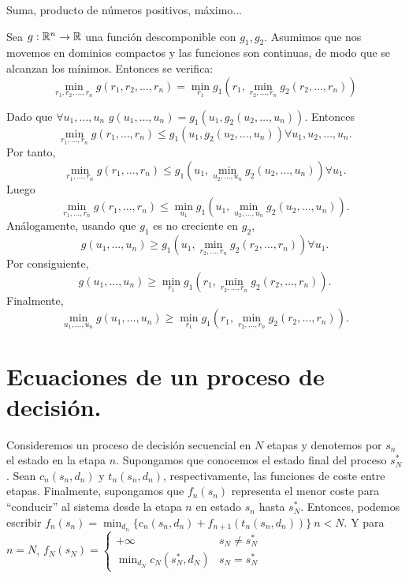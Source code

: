 \documentclass[MIOP.tex]{subfiles}
\begin{document}
\begin{ej}
Suma, producto de números positivos, máximo... 
\end{ej}

\begin{teorema}[Mitten] 
Sea $g:\mathbb{R}^n\to\mathbb{R}$ una función descomponible con $g_1,g_2$. Asumimos que nos movemos en dominios compactos y las funciones son continuas, de modo que se alcanzan los mínimos. Entonces se verifica:
$$\min_{r_1,r_2,\dots,r_n} g(r_1,r_2,\dots,r_n)=\min_{r_1} g_1(r_1,\min_{r_2,\dots,r_n}g_2(r_2,\dots,r_n))$$

\end{teorema}
\begin{dem}
Dado que $\forall u_1,\dots, u_n$ $g(u_1,\dots, u_n)=g_1(u_1,g_2(u_2,\dots, u_n))$. Entonces $$\min_{r_1,\dots,r_n}g(r_1,\dots,r_n)\leq g_1(u_1,g_2(u_2,\dots, u_n))\forall u_1,u_2,\dots,u_n.$$ Por tanto, $$\min_{r_1,\dots,r_n}g(r_1,\dots,r_n)\leq g_1(u_1,\min_{u_2,\dots,u_n}g_2(u_2,\dots, u_n))\forall u_1.$$ Luego $$\min_{r_1,\dots,r_n}g(r_1,\dots,r_n)\leq \min_{u_1}g_1(u_1,\min_{u_2,\dots,u_n}g_2(u_2,\dots, u_n)).$$
Análogamente, usando que $g_1$ es no creciente en $g_2$, $$g(u_1,\dots, u_n)\geq g_1(u_1,\min_{r_2,\dots,r_n}g_2(r_2,\dots,r_n))\forall u_1.$$ Por consiguiente, 
$$g(u_1,\dots, u_n)\geq \min_{r_1}g_1(r_1,\min_{r_2,\dots,r_n}g_2(r_2,\dots,r_n)).$$ Finalmente,
$$\min_{u_1,\dots,u_n}g(u_1,\dots, u_n)\geq \min_{r_1}g_1(r_1,\min_{r_2,\dots,r_n}g_2(r_2,\dots,r_n)).$$\QED
\end{dem}

\section{Ecuaciones de un proceso de decisión.}
Consideremos un proceso de decisión secuencial en $N$ etapas y denotemos por $s_n$ el estado en la etapa $n$. Supongamos que conocemos el estado final del proceso $s_N^*$. Sean $c_n(s_n,d_n)$ y $t_n(s_n,d_n)$, respectivamente, las funciones de coste entre etapas. Finalmente, supongamos que $f_n(s_n)$ representa el menor coste para ``conducir'' al sistema desde la etapa $n$ en estado $s_n$ hasta $s_N^*$. Entonces, podemos escribir $f_n(s_n)=\min_{d_n}\{c_n(s_n,d_n)+f_{n+1}(t_n(s_n,d_n))\}\ n<N$. Y para $n=N$, $f_N(s_N)=\begin{cases}
+\infty & s_N\neq s_N^*\\
\min_{d_N}c_N(s_N^*, d_N) & s_N=s_N^*
\end{cases}$
\end{document}
